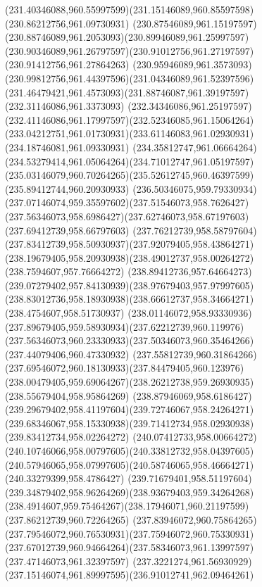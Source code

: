 {    \curveto(231.40346088,960.55997599)(231.15146089,960.85597598)(230.86212756,961.09730931)
    \curveto(230.87546089,961.15197597)(230.88746089,961.2053093)(230.89946089,961.25997597)
    \curveto(230.90346089,961.26797597)(230.91012756,961.27197597)(230.91412756,961.27864263)
    \curveto(230.95946089,961.3573093)(230.99812756,961.44397596)(231.04346089,961.52397596)
    \curveto(231.46479421,961.4573093)(231.88746087,961.39197597)(232.31146086,961.3373093)
    \curveto(232.34346086,961.25197597)(232.41146086,961.17997597)(232.52346085,961.15064264)
    \curveto(233.04212751,961.01730931)(233.61146083,961.02930931)(234.18746081,961.09330931)
    \curveto(234.35812747,961.06664264)(234.53279414,961.05064264)(234.71012747,961.05197597)
    \curveto(235.03146079,960.70264265)(235.52612745,960.46397599)(235.89412744,960.20930933)
    \curveto(236.50346075,959.79330934)(237.07146074,959.35597602)(237.51546073,958.7626427)
    \curveto(237.56346073,958.6986427)(237.62746073,958.67197603)(237.69412739,958.66797603)
    \curveto(237.76212739,958.58797604)(237.83412739,958.50930937)(237.92079405,958.43864271)
    \curveto(238.19679405,958.20930938)(238.49012737,958.00264272)(238.7594607,957.76664272)
    \curveto(238.89412736,957.64664273)(239.07279402,957.84130939)(238.97679403,957.97997605)
    \curveto(238.83012736,958.18930938)(238.66612737,958.34664271)(238.4754607,958.51730937)
    \curveto(238.01146072,958.93330936)(237.89679405,959.58930934)(237.62212739,960.119976)
    \curveto(237.56346073,960.23330933)(237.50346073,960.35464266)(237.44079406,960.47330932)
    \curveto(237.55812739,960.31864266)(237.69546072,960.18130933)(237.84479405,960.123976)
    \curveto(238.00479405,959.69064267)(238.26212738,959.26930935)(238.55679404,958.95864269)
    \curveto(238.87946069,958.6186427)(239.29679402,958.41197604)(239.72746067,958.24264271)
    \curveto(239.68346067,958.15330938)(239.71412734,958.02930938)(239.83412734,958.02264272)
    \curveto(240.07412733,958.00664272)(240.10746066,958.00797605)(240.33812732,958.04397605)
    \curveto(240.57946065,958.07997605)(240.58746065,958.46664271)(240.33279399,958.4786427)
    \curveto(239.71679401,958.51197604)(239.34879402,958.96264269)(238.93679403,959.34264268)
    \curveto(238.4914607,959.75464267)(238.17946071,960.21197599)(237.86212739,960.72264265)
    \curveto(237.83946072,960.75864265)(237.79546072,960.76530931)(237.75946072,960.75330931)
    \curveto(237.67012739,960.94664264)(237.58346073,961.13997597)(237.47146073,961.32397597)
    \curveto(237.3221274,961.56930929)(237.15146074,961.89997595)(236.91012741,962.09464261)
}
